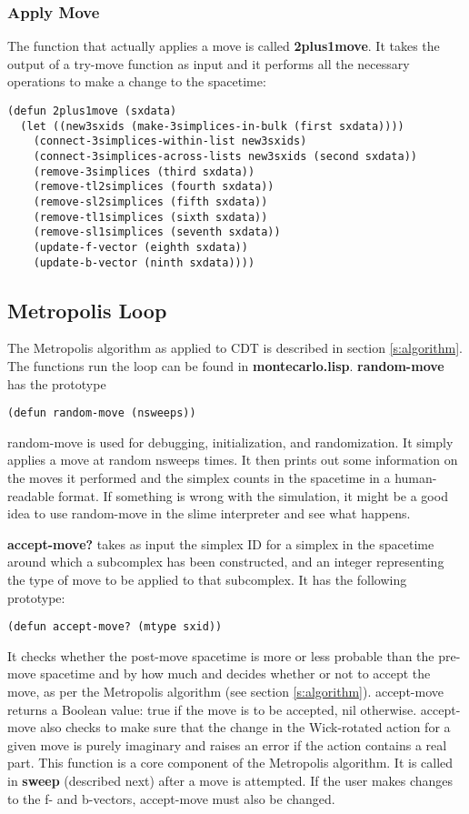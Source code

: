 \documentclass[12pt]{article}
\begin{document}
\subsubsection{Apply Move}

The function that actually applies a move is called
\textbf{2plus1move}. It takes the output of a try-move function as
input and it performs all the necessary operations to make a change to
the spacetime:
\begin{lstlisting}
(defun 2plus1move (sxdata)
  (let ((new3sxids (make-3simplices-in-bulk (first sxdata))))
    (connect-3simplices-within-list new3sxids)
    (connect-3simplices-across-lists new3sxids (second sxdata))
    (remove-3simplices (third sxdata))
    (remove-tl2simplices (fourth sxdata))
    (remove-sl2simplices (fifth sxdata))
    (remove-tl1simplices (sixth sxdata))
    (remove-sl1simplices (seventh sxdata))
    (update-f-vector (eighth sxdata))
    (update-b-vector (ninth sxdata))))
\end{lstlisting}

\subsection{Metropolis Loop}
\label{s:f:metropolis:loop}

The Metropolis algorithm as applied to CDT is described in section
\ref{s:algorithm}. The functions run the loop can be found in
\textbf{montecarlo.lisp}. \textbf{random-move} has the prototype 
\begin{lstlisting}
(defun random-move (nsweeps))
\end{lstlisting}
random-move is used for debugging, initialization, and
randomization. It simply applies a move at random nsweeps times. It
then prints out some information on the moves it performed and the
simplex counts in the spacetime in a human-readable format. If
something is wrong with the simulation, it might be a good idea to use
random-move in the slime interpreter and see what happens.

\textbf{accept-move?} takes as input the simplex ID for a simplex in
the spacetime around which a subcomplex has been constructed, and an
integer representing the type of move to be applied to that
subcomplex. It has the following prototype:
\begin{lstlisting}
(defun accept-move? (mtype sxid))
\end{lstlisting}
It checks whether the post-move spacetime is more or less probable
than the pre-move spacetime and by how much and decides whether or not
to accept the move, as per the Metropolis algorithm (see section
\ref{s:algorithm}). accept-move returns a Boolean value: true if the
move is to be accepted, nil otherwise. accept-move also checks to make
sure that the change in the Wick-rotated action for a given move is
purely imaginary and raises an error if the action contains a real
part. This function is a core component of the Metropolis
algorithm. It is called in \textbf{sweep} (described next) after a
move is attempted. If the user makes changes to the f- and b-vectors,
accept-move must also be changed.
\end{document}
